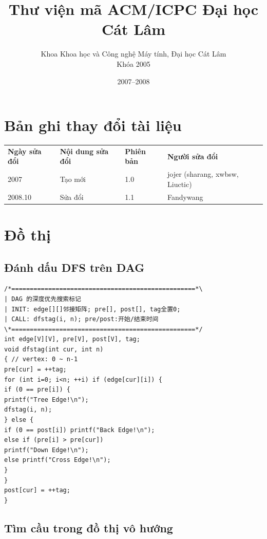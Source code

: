 \documentclass[11pt]{article}
\title{Thư viện mã ACM/ICPC Đại học Cát Lâm}
\author{Khoa Khoa học và Công nghệ Máy tính, Đại học Cát Lâm\\Khóa 2005}
\date{2007--2008}
\begin{document}
\maketitle

\section*{Bản ghi thay đổi tài liệu}
\begin{center}
\begin{tabular}{llll}
\textbf{Ngày sửa đổi} & \textbf{Nội dung sửa đổi} & \textbf{Phiên bản} & \textbf{Người sửa đổi}\\
2007 & Tạo mới & 1.0 & jojer (sharang, xwbsw, Liuctic)\\
2008.10 & Sửa đổi & 1.1 & Fandywang\\
\end{tabular}
\end{center}

\tableofcontents
\clearpage

\section{Đồ thị}

\subsection{Đánh dấu DFS trên DAG}

\begingroup
\scriptsize
\begin{verbatim}
/*==================================================*\
| DAG 的深度优先搜索标记
| INIT: edge[][]邻接矩阵; pre[], post[], tag全置0;
| CALL: dfstag(i, n); pre/post:开始/结束时间
\*==================================================*/
int edge[V][V], pre[V], post[V], tag;
void dfstag(int cur, int n)
{ // vertex: 0 ~ n-1
pre[cur] = ++tag;
for (int i=0; i<n; ++i) if (edge[cur][i]) {
if (0 == pre[i]) {
printf("Tree Edge!\n");
dfstag(i, n);
} else {
if (0 == post[i]) printf("Back Edge!\n");
else if (pre[i] > pre[cur])
printf("Down Edge!\n");
else printf("Cross Edge!\n");
}
}
post[cur] = ++tag;
}
\end{verbatim}
\endgroup

\subsection{Tìm cầu trong đồ thị vô hướng}
\end{document}

